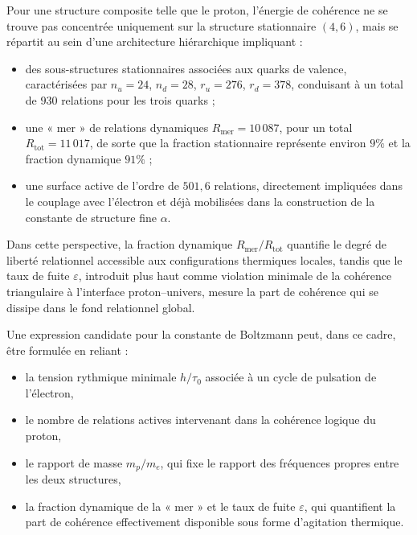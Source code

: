 \documentclass[11pt,a4paper]{article}
\begin{document}
Pour une structure composite telle que le proton, l’énergie de cohérence ne se trouve pas concentrée uniquement sur la structure stationnaire \(\left(4,6\right)\), mais se répartit au sein d’une architecture hiérarchique impliquant :
\begin{itemize}
  \item des sous-structures stationnaires associées aux quarks de valence, caractérisées par \(n_u=24\), \(n_d=28\), \(r_u=276\), \(r_d=378\), conduisant à un total de \(930\) relations pour les trois quarks ;
  \item une « mer » de relations dynamiques \(R_{\mathrm{mer}} = 10\,087\), pour un total \(R_{\mathrm{tot}} = 11\,017\), de sorte que la fraction stationnaire représente environ \(9\%\) et la fraction dynamique \(91\%\) ;
  \item une surface active de l’ordre de \(501{,}6\) relations, directement impliquées dans le couplage avec l’électron et déjà mobilisées dans la construction de la constante de structure fine \(\alpha\).
\end{itemize}

Dans cette perspective, la fraction dynamique \(R_{\mathrm{mer}}/R_{\mathrm{tot}}\) quantifie le degré de liberté relationnel accessible aux configurations thermiques locales, tandis que le taux de fuite \(\varepsilon\), introduit plus haut comme violation minimale de la cohérence triangulaire à l’interface proton–univers, mesure la part de cohérence qui se dissipe dans le fond relationnel global.

Une expression candidate pour la constante de Boltzmann peut, dans ce cadre, être formulée en reliant :
\begin{itemize}
  \item la tension rythmique minimale \(h/\tau_0\) associée à un cycle de pulsation de l’électron,
  \item le nombre de relations actives intervenant dans la cohérence logique du proton,
  \item le rapport de masse \(m_p/m_e\), qui fixe le rapport des fréquences propres entre les deux structures,
  \item la fraction dynamique de la « mer » et le taux de fuite \(\varepsilon\), qui quantifient la part de cohérence effectivement disponible sous forme d’agitation thermique.
\end{itemize}
\end{document}
